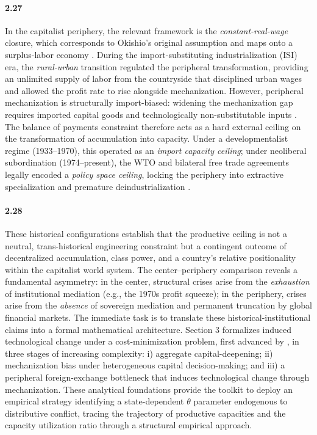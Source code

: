 \paragraph{2.27}
In the capitalist periphery, the relevant framework is the
\textit{constant-real-wage} closure, which corresponds to
Okishio's original assumption and maps onto a surplus-labor
economy \citep{Lewis1954, Basu2026}. During the
import-substituting industrialization (ISI) era, the
\textit{rural-urban} transition regulated the peripheral
transformation, providing an unlimited supply of labor from
the countryside that disciplined urban wages and allowed the
profit rate to rise alongside mechanization. However,
peripheral mechanization is structurally import-biased:
widening the mechanization gap requires imported capital
goods and technologically non-substitutable inputs
\citep{Prebisch1981}. The balance of payments constraint
therefore acts as a hard external ceiling on the
transformation of accumulation into capacity. Under a
developmentalist regime (1933--1970), this operated as an
\textit{import capacity ceiling}; under neoliberal
subordination (1974--present), the WTO and bilateral free
trade agreements legally encoded a \textit{policy space
	ceiling}, locking the periphery into extractive
specialization and premature deindustrialization
\citep{Ahumada2019, Palma2019}.

\paragraph{2.28}
These historical configurations establish that the productive
ceiling is not a neutral, trans-historical engineering
constraint but a contingent outcome of decentralized
accumulation, class power, and a country's relative
positionality within the capitalist world system. The
center--periphery comparison reveals a fundamental asymmetry:
in the center, structural crises arise from the
\textit{exhaustion} of institutional mediation (e.g., the
1970s profit squeeze); in the periphery, crises arise from
the \textit{absence} of sovereign mediation and permanent
truncation by global financial markets. The immediate task
is to translate these historical-institutional claims into a
formal mathematical architecture. Section 3 formalizes
induced technological change under a cost-minimization
problem, first advanced by \citet{CajasGuajirro2024}, in
three stages of increasing complexity: i) aggregate
capital-deepening; ii) mechanization bias under heterogeneous
capital decision-making; and iii) a peripheral
foreign-exchange bottleneck that induces technological change
through mechanization. These analytical foundations provide
the toolkit to deploy an empirical strategy identifying a
state-dependent $\theta$ parameter endogenous to
distributive conflict, tracing the trajectory of productive
capacities and the capacity utilization ratio through a
structural empirical approach.
